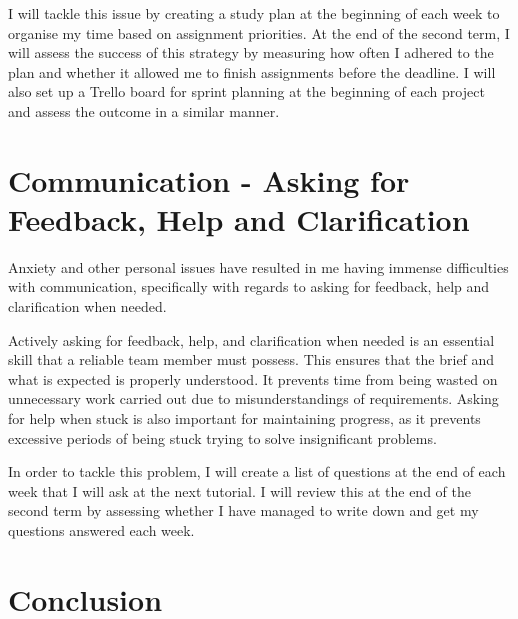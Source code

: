 \documentclass{scrartcl}
\begin{document}
I will tackle this issue by creating a study plan at the beginning of each week to organise my time based on assignment priorities. At the end of the second term, I will assess the success of this strategy by measuring how often I adhered to the plan and whether it allowed me to finish assignments before the deadline. I will also set up a Trello board for sprint planning at the beginning of each project and assess the outcome in a similar manner.

\section{Communication - Asking for Feedback, Help and Clarification}
Anxiety and other personal issues have resulted in me having immense difficulties with communication, specifically with regards to asking for feedback, help and clarification when needed. 

Actively asking for feedback, help, and clarification when needed is an essential skill that a reliable team member must possess. This ensures that the brief and what is expected is properly understood. It prevents time from being wasted on unnecessary work carried out due to misunderstandings of requirements. Asking for help when stuck is also important for maintaining progress, as it prevents excessive periods of being stuck trying to solve insignificant problems.

In order to tackle this problem, I will create a list of questions at the end of each week that I will ask at the next tutorial. I will review this at the end of the second term by assessing whether I have managed to write down and get my questions answered each week. 

\section{Conclusion}



\end{document}
